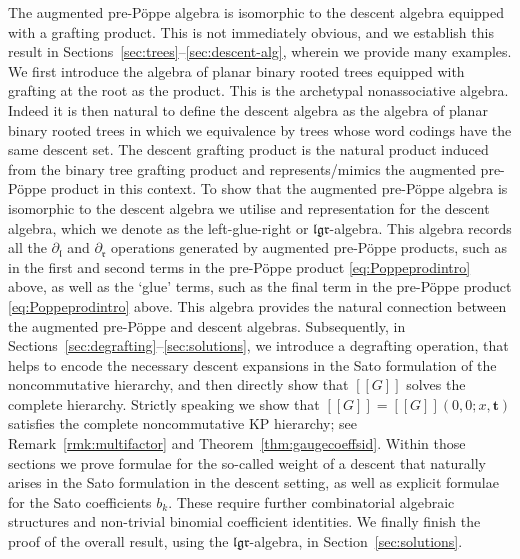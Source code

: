 \documentclass[5p,twocolumn]{elsarticle}
\newcommand*{\pa}{{\partial}}
\newcommand*{\lb}{[\![}
\newcommand*{\rb}{]\!]}
\newcommand*{\tbf}{\boldsymbol{t}}
\newcommand*{\el}{\mathfrak l}
\newcommand*{\gl}{\mathfrak g}
\newcommand*{\rl}{\mathfrak r}
\begin{document}
The augmented pre-P\"oppe algebra is isomorphic to the descent algebra equipped with a grafting product.
This is not immediately obvious, and we establish this result in Sections~\ref{sec:trees}--\ref{sec:descent-alg}, wherein we provide many examples.
We first introduce the algebra of planar binary rooted trees equipped with grafting at the root as the product.
This is the archetypal nonassociative algebra.
Indeed it is then natural to define the descent algebra as the algebra of planar binary rooted trees in which we equivalence by trees whose word codings have the same descent set.
The descent grafting product is the natural product induced from the binary tree grafting product and represents/mimics the augmented pre-P\"oppe product in this context.
To show that the augmented pre-P\"oppe algebra is isomorphic to the descent algebra we utilise and representation for the descent algebra, which we denote as the left-glue-right or $\el\gl\rl$-algebra.
This algebra records all the $\pa_{\el}$ and $\pa_{\rl}$ operations generated by augmented pre-P\"oppe products, such as in the first and second terms in the pre-P\"oppe product \eqref{eq:Poppeprodintro} above,
as well as the `glue' terms, such as the final term in the pre-P\"oppe product \eqref{eq:Poppeprodintro} above.
This algebra provides the natural connection between the augmented pre-P\"oppe and descent algebras.
Subsequently, in Sections~\ref{sec:degrafting}--\ref{sec:solutions}, we introduce a degrafting operation, that helps to encode the necessary descent expansions in the Sato formulation of
the noncommutative hierarchy, and then directly show that $\lb G\rb$ solves the complete hierarchy.
Strictly speaking we show that $\lb G\rb=\lb G\rb(0,0;x,\tbf)$ satisfies the complete noncommutative KP hierarchy; see Remark~\ref{rmk:multifactor} and Theorem~\ref{thm:gaugecoeffsid}.
Within those sections we prove formulae for the so-called weight of a descent that naturally arises in the Sato formulation in the descent setting,
as well as explicit formulae for the Sato coefficients $b_k$.
These require further combinatorial algebraic structures and non-trivial binomial coefficient identities.
We finally finish the proof of the overall result, using the $\el\gl\rl$-algebra, in Section~\ref{sec:solutions}. 
\end{document}
